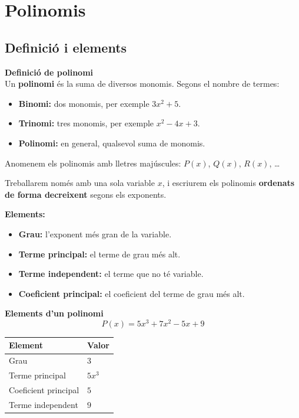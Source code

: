 \documentclass[12pt]{article}
\begin{document}
\newpage

\section{Polinomis}

\subsection{Definició i elements}

\begin{concept}
\textbf{Definició de polinomi}\\
Un \textbf{polinomi} és la suma de diversos monomis. Segons el nombre de termes:
\begin{itemize}
    \item \textbf{Binomi:} dos monomis, per exemple $3x^2 + 5$.
    \item \textbf{Trinomi:} tres monomis, per exemple $x^2 - 4x + 3$.
    \item \textbf{Polinomi:} en general, qualsevol suma de monomis.
\end{itemize}

Anomenem els polinomis amb lletres majúscules: $P(x)$, $Q(x)$, $R(x)$, \dots

Treballarem només amb una sola variable $x$, i escriurem els polinomis \textbf{ordenats de forma decreixent} segons els exponents.

\textbf{Elements:}
\begin{itemize}
    \item \textbf{Grau:} l'exponent més gran de la variable.
    \item \textbf{Terme principal:} el terme de grau més alt.
    \item \textbf{Terme independent:} el terme que no té variable.
    \item \textbf{Coeficient principal:} el coeficient del terme de grau més alt.
\end{itemize}
\end{concept}

\begin{exemple}
\textbf{Elements d'un polinomi}
\[
P(x) = 5x^3 + 7x^2 - 5x + 9
\]
\begin{center}
\small
\begin{tabular}{ll}
\toprule
\textbf{Element} & \textbf{Valor} \\
\midrule
Grau & $3$ \\
Terme principal & $5x^3$ \\
Coeficient principal & $5$ \\
Terme independent & $9$ \\
\bottomrule
\end{tabular}
\end{center}
\end{exemple}
\end{document}
